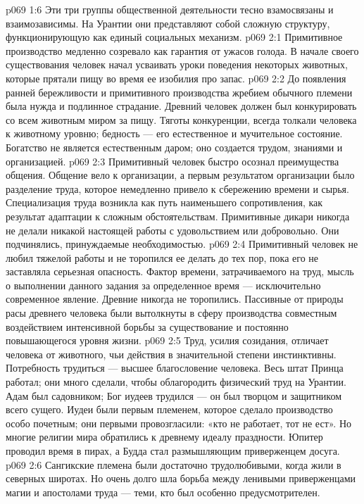 \vs p069 1:6 \pc Эти три группы общественной деятельности тесно взамосвязаны и взаимозависимы. На Урантии они представляют собой сложную структуру, функционирующую как единый социальных механизм.
\vs p069 2:1 Примитивное производство медленно созревало как гарантия от ужасов голода. В начале своего существования человек начал усваивать уроки поведения некоторых животных, которые прятали пищу во время ее изобилия про запас.
\vs p069 2:2 До появления ранней бережливости и примитивного производства жребием обычного племени была нужда и подлинное страдание. Древний человек должен был конкурировать со всем животным миром за пищу. Тяготы конкуренции, всегда толкали человека к животному уровню; бедность --- его естественное и мучительное состояние. Богатство не является естественным даром; оно создается трудом, знаниями и организацией.
\vs p069 2:3 Примитивный человек быстро осознал преимущества общения. Общение вело к организации, а первым результатом организации было разделение труда, которое немедленно привело к сбережению времени и сырья. Специализация труда возникла как путь наименьшего сопротивления, как результат адаптации к сложным обстоятельствам. Примитивные дикари никогда не делали никакой настоящей работы с удовольствием или добровольно. Они подчинялись, принуждаемые необходимостью.
\vs p069 2:4 Примитивный человек не любил тяжелой работы и не торопился ее делать до тех пор, пока его не заставляла серьезная опасность. Фактор времени, затрачиваемого на труд, мысль о выполнении данного задания за определенное время --- исключительно современное явление. Древние никогда не торопились. Пассивные от природы расы древнего человека были вытолкнуты в сферу производства совместным воздействием интенсивной борьбы за существование и постоянно повышающегося уровня жизни.
\vs p069 2:5 Труд, усилия созидания, отличает человека от животного, чьи действия в значительной степени инстинктивны. Потребность трудиться --- высшее благословение человека. Весь штат Принца работал; они много сделали, чтобы облагородить физический труд на Урантии. Адам был садовником; Бог иудеев трудился --- он был творцом и защитником всего сущего. Иудеи были первым племенем, которое сделало производство особо почетным; они первыми провозгласили: «кто не работает, тот не ест». Но многие религии мира обратились к древнему идеалу праздности. Юпитер проводил время в пирах, а Будда стал размышляющим приверженцем досуга.
\vs p069 2:6 Сангикские племена были достаточно трудолюбивыми, когда жили в северных широтах. Но очень долго шла борьба между ленивыми приверженцами магии и апостолами труда --- теми, кто был особенно предусмотрителен.
